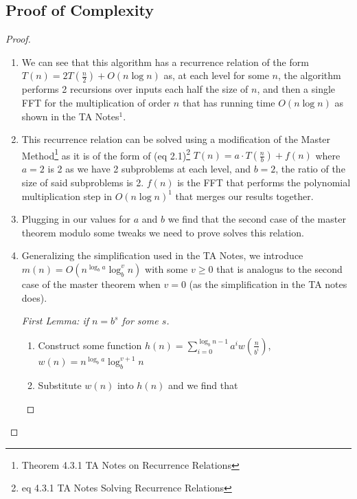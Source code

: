 \documentclass{article}
\begin{document}
\subsection{Proof of Complexity}
\begin{proof}
      \begin{enumerate}
            \item We can see that this algorithm has a recurrence relation of the form
                  \(T{(n)}=2T{(\frac{n}{2})} + O{(n \log n)}\) as, at each level for some
                  \(n\), the algorithm performs 2 recursions over inputs each half the size of
                  \(n\), and then a single FFT for the multiplication of order \(n\) that has
                  running time \(O{(n \log n)}\) as shown in the TA Notes\(^1\).
            \item This recurrence relation can be solved using a modification of the Master
                  Method\footnote{Theorem 4.3.1 TA Notes on Recurrence Relations} as it is of
                  the form of (eq 2.1)\footnote{eq 4.3.1 TA Notes Solving Recurrence Relations}
                  \(T(n) = a \cdot T(\frac{n}{b}) + f(n)\) where \(a=2\) is 2 as we have 2
                  subproblems at each level, and \(b=2\), the ratio of the size of said
                  subproblems is 2. \(f(n)\) is the FFT that performs the polynomial
                  multiplication step in \(O{(n \log n)}^1\) that merges our results together.
            \item Plugging in our values for \(a\) and \(b\) we find that the second case of
                  the master theorem modulo some tweaks we need to prove solves this relation.
            \item Generalizing the simplification used in the TA Notes, we introduce \(m(n) =
                  O(n^{\log_{b} a} \log_{b}^{v} n)\) with some \(v\geq 0\) that is analogus to
                  the second case of the master theorem when \(v=0\) (as the simplification in
                  the TA notes does).
                  \subitem\begin{proof}[First Lemma: if \(n = b^s\) for some \(s\)]
                        \begin{enumerate}
                              \item Construct some function \(h(n)=\sum_{i=0}^{\log_b n-1} a^i
                                    w(\frac{n}{b^i}) \), \(w(n)=n^{\log_{b} a} \log_{b}^{v+1} n\)
                              \item Substitute \(w(n)\) into \(h(n)\) and we find that

\end{enumerate}
\end{proof}
\end{enumerate}
\end{proof}
\end{document}
